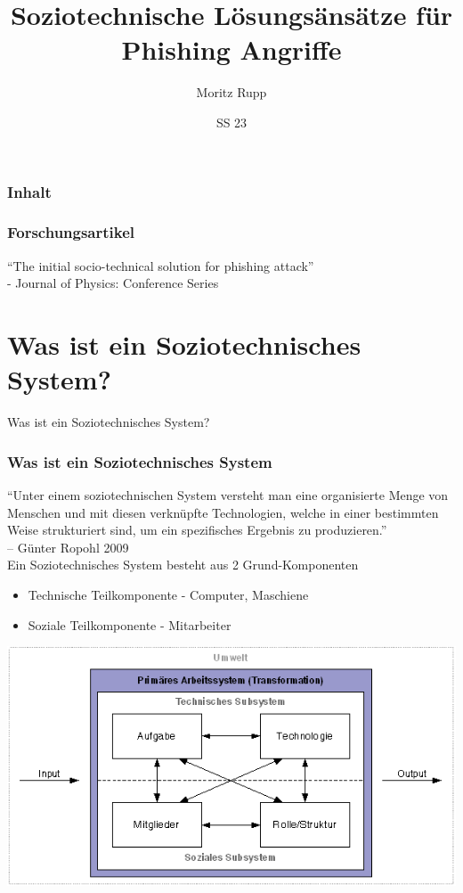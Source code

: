 \documentclass{beamer}
\title[Social Engineering]{Soziotechnische Lösungsänsätze für Phishing Angriffe }
\author{Moritz Rupp}
\institute[MR]{Hochschule Albstadt-Sigmaringen}
\date{SS 23}
\begin{document}
\begin{frame}
 \titlepage
\end{frame}
\begin{frame}
 \frametitle{Inhalt}
 \tableofcontents
\end{frame}
\begin{frame}
 \frametitle{Forschungsartikel}
 ``The initial socio-technical solution for phishing
 attack''
 \vspace{4mm}\\
 - Journal of Physics: Conference Series
\end{frame}

\section{Was ist ein Soziotechnisches System?}
\begin{frame}{Was ist ein Soziotechnisches System? }
 \frametitle{Was ist ein Soziotechnisches System}
 ``Unter einem soziotechnischen System versteht man eine organisierte Menge von Menschen und mit diesen verknüpfte Technologien, welche in einer bestimmten Weise strukturiert sind, um ein spezifisches Ergebnis zu produzieren.''\\
 – Günter Ropohl 2009
 \\
 \vspace{10mm}
 Ein Soziotechnisches System besteht aus 2 Grund-Komponenten
 \begin{itemize}
  \item Technische Teilkomponente - Computer, Maschiene
  \item Soziale Teilkomponente - Mitarbeiter
 \end{itemize}
\end{frame}
\begin{frame}
\begin{center}
 \includegraphics[scale=0.5]{data/sozio.png}

\end{center}

\end{frame}
\end{document}
